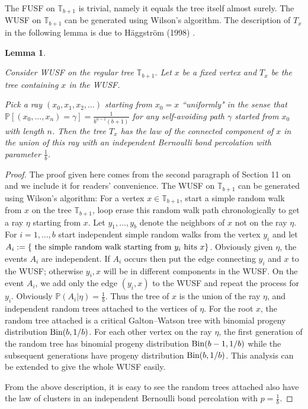 \documentclass[12pt]{article}
\newtheorem{lemma}[theorem]{Lemma}
\numberwithin{equation}{section}
\newcommand{\1}{\mathbf{1}}
\begin{document}
 The FUSF on $\mathbb{T}_{b+1}$ is trivial, namely it equals the tree itself almost surely. The WUSF on $\mathbb{T}_{b+1}$ can be generated using  Wilson's algorithm. 
The description of $T_x$ in the following lemma is due to H\"{a}ggstr\"{o}m (1998) \cite{Hag1998}.
\begin{lemma}\label{lem: law of T_x in WUSF for the toy model}
	
	Consider WUSF on the regular tree $\mathbb{T}_{b+1}$. Let  $x$ be a fixed vertex and  $T_x$  be the tree containing $x$ in the WUSF. 
	
	Pick a ray $(x_0,x_1,x_2,\ldots)$ starting from $x_0=x$ ``uniformly" in the sense that $\mathbb{P}[(x_0,\ldots,x_n)=\gamma]=\frac{1}{b^{n-1}(b+1)}$ for any self-avoiding path $\gamma$ started from $x_0$ with length $n$. 
	Then the tree $T_x$ has the law of the connected component of $x$ in the union of this ray with an independent Bernoulli bond percolation with parameter $\frac{1}{b}$.
	
\end{lemma}
\begin{proof}
	The proof given here comes from the second paragraph of Section 11 on \cite[page 42]{BLPS2001} and we include it for readers' convenience. 
	The WUSF on $\mathbb{T}_{b+1}$ can be generated using  Wilson's algorithm:  
	For a vertex $x\in \mathbb{T}_{b+1}$, start a simple random walk from $x$ on the tree $\mathbb{T}_{b+1}$, loop erase this random walk path chronologically to get a ray $\eta$ starting from $x$. Let  $y_1,\ldots,y_b$ denote the neighbors of $x$ not on the ray $\eta$. For $i=1,\ldots,b$ start independent simple random walks from the vertex $y_i$ and let $A_i:=\{\textnormal{ the simple random walk starting from } y_i \textnormal{ hits } x \}$.  Obviously given $\eta$, the events $A_i$ are independent. If $A_i$ occurs then put the edge connecting $y_i$ and $x$ to the WUSF; otherwise $y_i,x$ will be in different components in the WUSF. On the event $A_i$, we add only the edge $(y_i,x)$ to the WUSF and repeat the process for $y_i$. Obviously $\mathbb{P}(A_i|\eta)=\frac{1}{b}$. Thus the tree of $x$ is the union of the ray $\eta$, and independent random trees attached to the vertices of $\eta$. For the root $x$, the random tree attached is a critical Galton--Watson tree with binomial progeny distribution $\textnormal{Bin}(b,1/b)$. For each other vertex on the ray $\eta$, the first generation of the random tree has binomial progeny distribution $\textnormal{Bin}(b-1,1/b)$ while the subsequent generations have progeny distribution $\textnormal{Bin}(b,1/b)$. This analysis can be extended to give the whole WUSF easily.
	
	From the above description, it is easy to see the random trees attached also have the law of clusters in an independent Bernoulli bond percolation with $p=\frac{1}{b}$.
\end{proof}
\end{document}
